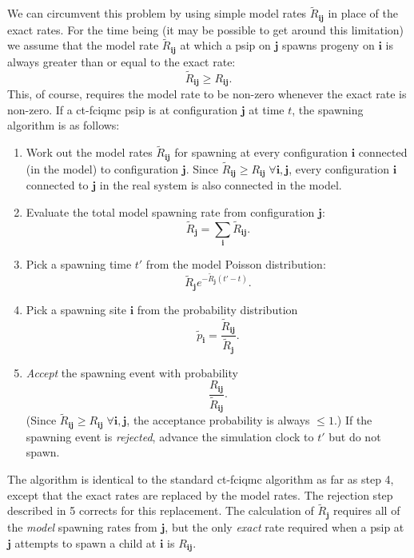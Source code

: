 \documentclass[a4paper, 11pt]{article}
\newcommand{\bi}{\mathbf{i}}
\newcommand{\bj}{\mathbf{j}}
\begin{document}
We can circumvent this problem by using simple model rates
$\tilde{R}_{\bi\bj}$ in place of the exact rates. For the time being (it
may be possible to get around this limitation) we assume that the model
rate $\tilde{R}_{\bi\bj}$ at which a psip on $\bj$ spawns progeny on
$\bi$ is always greater than or equal to the exact rate:
\begin{equation*}
\tilde{R}_{\bi\bj} \geq R_{\bi\bj} .
\end{equation*}
This, of course, requires the model rate to be non-zero whenever the
exact rate is non-zero. If a ct-fciqmc psip is at configuration $\bj$ at
time $t$, the spawning algorithm is as follows:
\begin{enumerate}
\item Work out the model rates $\tilde{R}_{\bi\bj}$ for spawning at
  every configuration $\bi$ connected (in the model) to configuration
  $\bj$. Since $\tilde{R}_{\bi\bj} \geq R_{\bi\bj} \; \forall \bi, \bj$,
  every configuration $\bi$ connected to $\bj$ in the real system is
  also connected in the model.
\item Evaluate the total model spawning rate from configuration $\bj$:
\begin{equation*}
  \tilde{R}_{\bj} = \sum_{\bi} \tilde{R}_{\bi\bj} .
\end{equation*}
\item Pick a spawning time $t'$ from the model Poisson distribution:
\begin{equation*}
  \tilde{R}_{\bj} e^{-\tilde{R}_{\bj}(t'-t)} .
\end{equation*}
\item Pick a spawning site $\bi$ from the probability distribution
\begin{equation*}
  \tilde{p}_{\bi} = \frac{\tilde{R}_{\bi\bj}}{\tilde{R}_{\bj}} .
\end{equation*}
\item \emph{Accept} the spawning event with probability
\begin{equation*}
  \frac{R_{\bi\bj}}{\tilde{R}_{\bi\bj}} .
\end{equation*}
(Since $\tilde{R}_{\bi\bj} \geq R_{\bi\bj}\;\forall \bi,\bj$, the
acceptance probability is always $\leq 1$.)  If the spawning event is
\emph{rejected}, advance the simulation clock to $t'$ but do not spawn.
\end{enumerate}
The algorithm is identical to the standard ct-fciqmc algorithm as far as
step 4, except that the exact rates are replaced by the model rates. The
rejection step described in 5 corrects for this replacement. The
calculation of $\tilde{R}_{\bj}$ requires all of the \emph{model}
spawning rates from $\bj$, but the only \emph{exact} rate required when
a psip at $\bj$ attempts to spawn a child at $\bi$ is $R_{\bi\bj}$.
\end{document}
